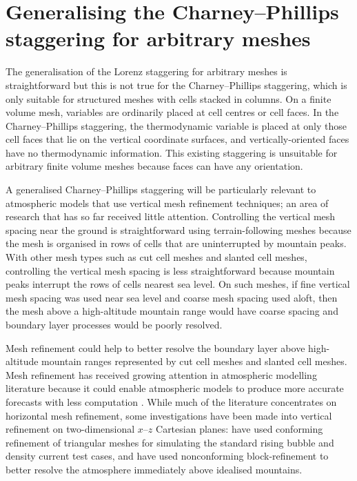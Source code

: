 \section{Generalising the Charney–Phillips staggering for arbitrary meshes}
\label{sec:cp:method}

The generalisation of the Lorenz staggering for arbitrary meshes is straightforward \citep{weller-shahrokhi2014} but this is not true for the Charney--Phillips staggering, which is only suitable for structured meshes with cells stacked in columns.
On a finite volume mesh, variables are ordinarily placed at cell centres or cell faces.
In the Charney--Phillips staggering, the thermodynamic variable is placed at only those cell faces that lie on the vertical coordinate surfaces, and vertically-oriented faces have no thermodynamic information.
This existing staggering is unsuitable for arbitrary finite volume meshes because faces can have any orientation.

A generalised Charney--Phillips staggering will be particularly relevant to atmospheric models that use vertical mesh refinement techniques; an area of research that has so far received little attention.
Controlling the vertical mesh spacing near the ground is straightforward using terrain-following meshes because the mesh is organised in rows of cells that are uninterrupted by mountain peaks.
With other mesh types such as cut cell meshes and slanted cell meshes, controlling the vertical mesh spacing is less straightforward because mountain peaks interrupt the rows of cells nearest sea level.
On such meshes, if fine vertical mesh spacing was used near sea level and coarse mesh spacing used aloft, then the mesh above a high-altitude mountain range would have coarse spacing and boundary layer processes would be poorly resolved.

Mesh refinement could help to better resolve the boundary layer above high-altitude mountain ranges represented by cut cell meshes and slanted cell meshes.
Mesh refinement has received growing attention in atmospheric modelling literature because it could enable atmospheric models to produce more accurate forecasts with less computation \citep{behrens2006,jablonowski2009}.
While much of the literature concentrates on horizontal mesh refinement, some investigations have been made into vertical refinement on two-dimensional $x$--$z$ Cartesian planes:
\citet{mueller2013} have used conforming refinement of triangular meshes for simulating the standard rising bubble and density current test cases, and \citet{yamazaki-satomura2012} have used nonconforming block-refinement to better resolve the atmosphere immediately above idealised mountains.

